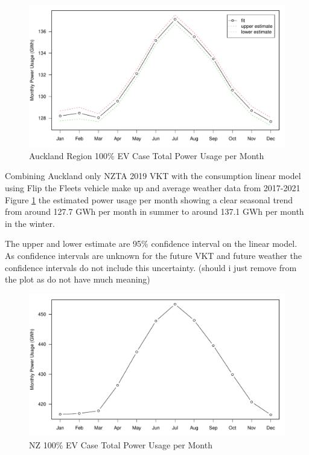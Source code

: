 \documentclass[
]{article}
\begin{document}
\begin{figure}
\centering
\includegraphics{final_report_files/figure-latex/Auckland_power-1.pdf}
\caption{Auckland Region 100\% EV Case Total Power Usage per
Month\label{fig:Auckland_power}}
\end{figure}

Combining Auckland only NZTA 2019 VKT with the consumption linear model
using Flip the Fleets vehicle make up and average weather data from
2017-2021 Figure \ref{fig:Auckland_power} the estimated power usage per
month showing a clear seasonal trend from around 127.7 GWh per month in
summer to around 137.1 GWh per month in the winter.

The upper and lower estimate are 95\% confidence interval on the linear
model. As confidence intervals are unknown for the future VKT and future
weather the confidence intervals do not include this uncertainty.
(should i just remove from the plot as do not have much meaning)

\begin{figure}
\centering
\includegraphics{final_report_files/figure-latex/NZ_power-1.pdf}
\caption{NZ 100\% EV Case Total Power Usage per
Month\label{fig:NZ_power}}
\end{figure}
\end{document}
